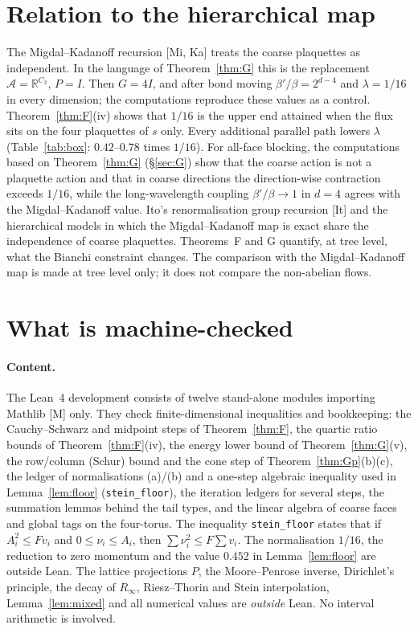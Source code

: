 \documentclass[11pt,a4paper]{article}
\theoremstyle{definition}
\theoremstyle{remark}
\newcommand{\R}{\mathbb{R}}
\newcommand{\cA}{\mathcal{A}}
\newcommand{\code}[1]{\texttt{#1}}
\begin{document}
\section{Relation to the hierarchical map}\label{sec:mk}

The Migdal--Kadanoff recursion [Mi, Ka] treats the coarse plaquettes as independent. In the language of Theorem~\ref{thm:G} this is the replacement $\cA=\R^{C_2}$, $P=I$. Then $G=4I$, and after bond moving $\beta'/\beta=2^{d-4}$ and $\lambda=1/16$ in every dimension; the computations reproduce these values as a control. Theorem~\ref{thm:F}(iv) shows that $1/16$ is the upper end attained when the flux sits on the four plaquettes of $s$ only. Every additional parallel path lowers $\lambda$ (Table~\ref{tab:box}: $0.42$--$0.78$ times $1/16$). For all-face blocking, the computations based on Theorem~\ref{thm:G} (\S\ref{sec:G}) show that the coarse action is not a plaquette action and that in coarse directions the direction-wise contraction exceeds $1/16$, while the long-wavelength coupling $\beta'/\beta\to1$ in $d=4$ agrees with the Migdal--Kadanoff value. Ito's renormalisation group recursion [It] and the hierarchical models in which the Migdal--Kadanoff map is exact share the independence of coarse plaquettes. Theorems~F and G quantify, at tree level, what the Bianchi constraint changes. The comparison with the Migdal--Kadanoff map is made at tree level only; it does not compare the non-abelian flows.

\section{What is machine-checked}\label{sec:lean}

\paragraph{Content.}
The Lean~4 development consists of twelve stand-alone modules importing Mathlib [M] only.
They check finite-dimensional inequalities and bookkeeping: the Cauchy--Schwarz and midpoint steps of Theorem~\ref{thm:F}, the quartic ratio bounds of Theorem~\ref{thm:F}(iv), the energy lower bound of Theorem~\ref{thm:G}(v), the row/column (Schur) bound and the cone step of Theorem~\ref{thm:Gp}(b)(c), the ledger of normalisations (a)/(b) and a one-step algebraic inequality used in Lemma~\ref{lem:floor} (\code{stein\_floor}), the iteration ledgers for several steps, the summation lemmas behind the tail types, and the linear algebra of coarse faces and global tags on the four-torus.
The inequality \code{stein\_floor} states that if $A_i^2\le Fv_i$ and $0\le\nu_i\le A_i$, then $\sum\nu_i^2\le F\sum v_i$.
The normalisation $1/16$, the reduction to zero momentum and the value $0.452$ in Lemma~\ref{lem:floor} are outside Lean.
The lattice projections $P$, the Moore--Penrose inverse, Dirichlet's principle, the decay of $R_\infty$, Riesz--Thorin and Stein interpolation, Lemma~\ref{lem:mixed} and all numerical values are \emph{outside} Lean. No interval arithmetic is involved.
\end{document}
